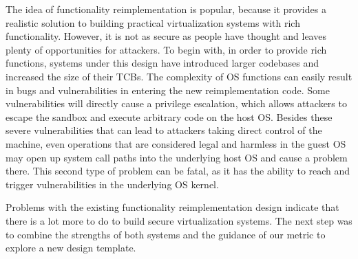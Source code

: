 The idea of functionality reimplementation is popular, because it provides a
realistic solution to building practical virtualization systems
with rich functionality. However, it is not as secure as people have thought
 and leaves plenty of opportunities for attackers.
To begin with, in order to provide rich functions, systems under this design have
introduced larger codebases and increased the size of their TCBs.
The complexity of OS functions can easily result in bugs and vulnerabilities in
entering the new reimplementation code. Some vulnerabilities
will directly cause a privilege escalation, which allows attackers to escape the sandbox
and execute arbitrary code on the host OS.
Besides these severe vulnerabilities that can lead to attackers taking direct control
of the machine, even operations that are considered
legal and harmless in the guest OS may open up system call paths into the underlying
host OS and cause a problem there.
This second type of problem can be fatal, as it has the ability to reach and
trigger vulnerabilities in the underlying OS kernel.

Problems with the existing functionality reimplementation design indicate that there
is a lot more to do to build secure virtualization systems. The next step was to
combine the strengths of both systems and the guidance of our metric to explore a
new design template.

